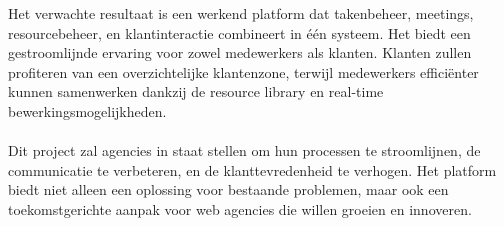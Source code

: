 Het verwachte resultaat is een werkend platform dat takenbeheer, meetings, resourcebeheer, en klantinteractie combineert in één systeem. Het biedt een gestroomlijnde ervaring voor zowel medewerkers als klanten. Klanten zullen profiteren van een overzichtelijke klantenzone, terwijl medewerkers efficiënter kunnen samenwerken dankzij de resource library en real-time bewerkingsmogelijkheden.
\\
\\
Dit project zal agencies in staat stellen om hun processen te stroomlijnen, de communicatie te verbeteren, en de klanttevredenheid te verhogen. Het platform biedt niet alleen een oplossing voor bestaande problemen, maar ook een toekomstgerichte aanpak voor web agencies die willen groeien en innoveren.
